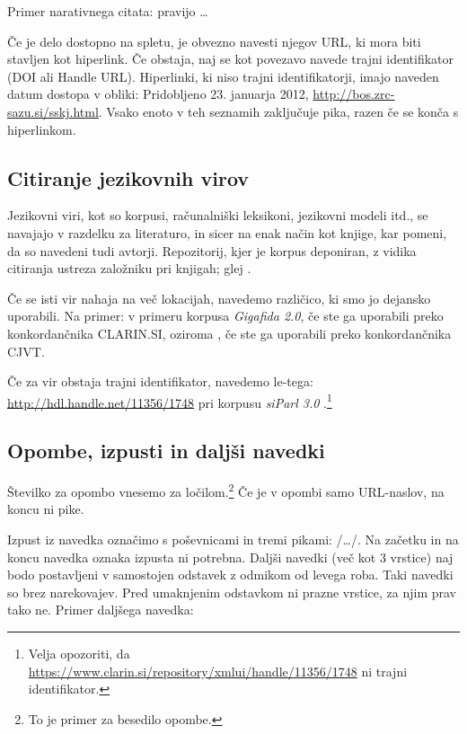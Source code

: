 \documentclass{article}
\begin{document}
Primer narativnega citata:  pravijo \ldots 

Če je delo dostopno na spletu, je obvezno navesti njegov URL, ki mora biti stavljen kot hiperlink. Če obstaja, naj se kot povezavo navede trajni identifikator (DOI ali Handle URL). Hiperlinki, ki niso trajni identifikatorji, imajo naveden datum dostopa v obliki: Pridobljeno 23. januarja 2012, \url{http://bos.zrc-sazu.si/sskj.html}. Vsako enoto v teh seznamih zaključuje pika, razen če se konča s hiperlinkom.

\subsection{Citiranje jezikovnih virov} 
Jezikovni viri, kot so korpusi, računalniški leksikoni, jezikovni modeli itd., se navajajo v razdelku za literaturo, in sicer na enak način kot knjige, kar pomeni, da so navedeni tudi avtorji. Repozitorij, kjer je korpus deponiran, z vidika citiranja ustreza založniku pri knjigah; glej \cite{parliamentaryCorpus}. 

Če se isti vir nahaja na več lokacijah, navedemo različico, ki smo jo dejansko uporabili. Na primer:  v primeru korpusa \textit{Gigafida 2.0}, če ste ga uporabili preko konkordančnika CLARIN.SI, oziroma , če ste ga uporabili preko konkordančnika CJVT.

Če za vir obstaja trajni identifikator, navedemo le-tega: \url{http://hdl.handle.net/11356/1748} pri korpusu \textit{siParl 3.0} \cite{parliamentaryCorpus}.\footnote{Velja opozoriti, da \url{https://www.clarin.si/repository/xmlui/handle/11356/1748} ni trajni identifikator.}





\subsection{Opombe, izpusti in daljši navedki}
Številko za opombo vnesemo za ločilom.\footnote{To je primer za besedilo opombe.} Če je v opombi samo URL-naslov, na koncu ni pike.

Izpust iz navedka označimo s poševnicami in tremi pikami: /\ldots/. Na začetku in na koncu navedka oznaka izpusta ni potrebna. Daljši navedki (več kot 3 vrstice) naj bodo postavljeni v samostojen odstavek z odmikom od levega roba. Taki navedki so brez narekovajev. Pred umaknjenim odstavkom ni prazne vrstice, za njim prav tako ne. Primer daljšega navedka:
\end{document}
